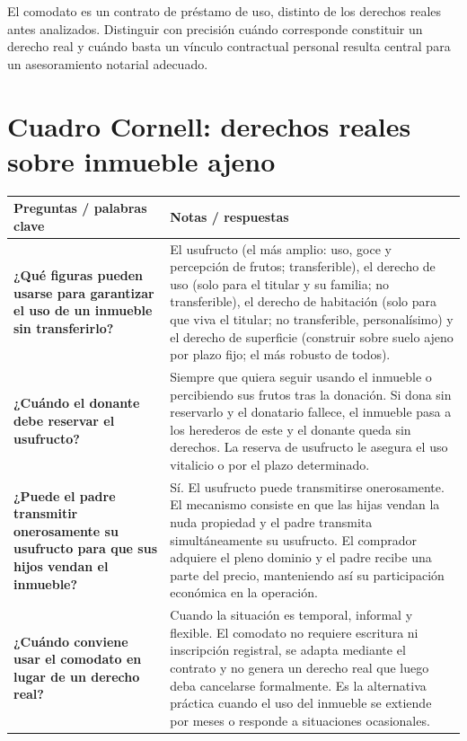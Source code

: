 \documentclass[12pt,oneside]{book}
\begin{document}
\begin{note}
El comodato es un contrato de préstamo de uso, distinto de los derechos reales antes analizados. Distinguir con precisión cuándo corresponde constituir un derecho real y cuándo basta un vínculo contractual personal resulta central para un asesoramiento notarial adecuado.
\end{note}

\section{Cuadro Cornell: derechos reales sobre inmueble ajeno}

\begin{table}[H]
\centering
\begin{tabularx}{\textwidth}{
    >{\raggedright\arraybackslash}p{}
    >{\raggedright\arraybackslash}X
}
\toprule
\textbf{Preguntas / palabras clave} & \textbf{Notas / respuestas} \\
\midrule

\textbf{¿Qué figuras pueden usarse para garantizar el uso de un inmueble sin transferirlo?} &
El usufructo (el más amplio: uso, goce y percepción de frutos; transferible), el derecho de uso (solo para el titular y su familia; no transferible), el derecho de habitación (solo para que viva el titular; no transferible, personalísimo) y el derecho de superficie (construir sobre suelo ajeno por plazo fijo; el más robusto de todos). \\

\textbf{¿Cuándo el donante debe reservar el usufructo?} &
Siempre que quiera seguir usando el inmueble o percibiendo sus frutos tras la donación. Si dona sin reservarlo y el donatario fallece, el inmueble pasa a los herederos de este y el donante queda sin derechos. La reserva de usufructo le asegura el uso vitalicio o por el plazo determinado. \\

\textbf{¿Puede el padre transmitir onerosamente su usufructo para que sus hijos vendan el inmueble?} &
Sí. El usufructo puede transmitirse onerosamente. El mecanismo consiste en que las hijas vendan la nuda propiedad y el padre transmita simultáneamente su usufructo. El comprador adquiere el pleno dominio y el padre recibe una parte del precio, manteniendo así su participación económica en la operación. \\

\textbf{¿Cuándo conviene usar el comodato en lugar de un derecho real?} &
Cuando la situación es temporal, informal y flexible. El comodato no requiere escritura ni inscripción registral, se adapta mediante el contrato y no genera un derecho real que luego deba cancelarse formalmente. Es la alternativa práctica cuando el uso del inmueble se extiende por meses o responde a situaciones ocasionales. \\


\end{tabularx}
\end{table}
\end{document}
